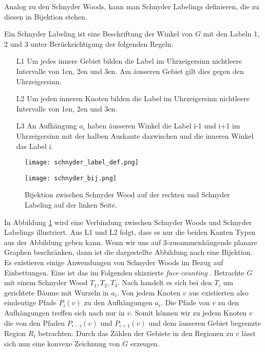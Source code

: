 Analog zu den Schnyder Woods, kann man Schnyder Labelings definieren, die zu diesen in Bijektion stehen.


\begin{definition}\label{def_sl}
Ein Schnyder Labeling ist eine Beschriftung der Winkel von $G$ mit den Labeln 1, 2 und 3 unter Berücksichtigung der folgenden Regeln:
\begin{itemize}
\item[L1] Um jedes innere Gebiet bilden die Label im Uhrzeigersinn nichtleere Intervalle von 1en, 2en und 3en. Am äusseren Gebiet gilt dies gegen den Uhrzeigersinn.
\item[L2] Um jeden inneren Knoten bilden die Label im Uhrzeigersinn nichtleere Intervalle von 1en, 2en und 3en.
\item[L3] An Aufhängung $a_i$ haben äusseren Winkel die Label i-1 und i+1 im Uhrzeigersinn mit der halben Auskante dazwischen und die inneren Winkel das Label i.
\end{itemize} 
\begin{figure}[h]
	\centering
  \texttt{[image: schnyder\_label\_def.png]}
\end{figure}
\end{definition}

\begin{figure}[h]
	\centering
  \texttt{[image: schnyder\_bij.png]}
	\caption{Bijektion zwischen Schnyder Wood auf der rechten und Schnyder Labeling auf der linken Seite.}
	\label{schnyder_bij}
\end{figure}

In Abbildung \ref{schnyder_bij} wird eine Verbindung zwischen Schnyder Woods und Schnyder Labelings illustriert. Aus L1 und L2 folgt, dass es nur die beiden Kanten Typen aus der Abbildung geben kann. Wenn wir uns auf 3-zusammenhängende planare Graphen beschränken, dann ist die dargestellte Abbildung nach \cite[Theorem 2.3]{felsner04} eine Bijektion. \\



Es existieren einige Anwendungen von Schnyder Woods im Bezug auf Einbettungen. Eine ist das im Folgenden skizzierte \textit{face-counting} \cite{felsner01}. Betrachte $G$ mit einem Schnyder Wood $T_1,T_2,T_3$. Nach \cite[Korollar 2.5]{felsner04} handelt es sich bei den $T_i$ um gerichtete Bäume mit Wurzeln in $a_i$. Von jedem Knoten $v$ aus existierten also eindeutige Pfade $P_i(v)$ zu den Aufhängungen $a_i$. Die Pfade von $v$ zu den Aufhängungen treffen sich nach \cite[Lemma 2.4]{felsner04} nur in $v$. Somit können wir zu jedem Knoten $v$ die von den Pfaden $P_{i-i}(v)$ und $P_{i+1}(v)$ und dem äusseren Gebiet begrenzte Region $R_i$ betrachten. Durch das Zählen der Gebiete in den Regionen zu $v$ lässt sich nun eine konvexe Zeichnung von $G$ erzeugen. \

